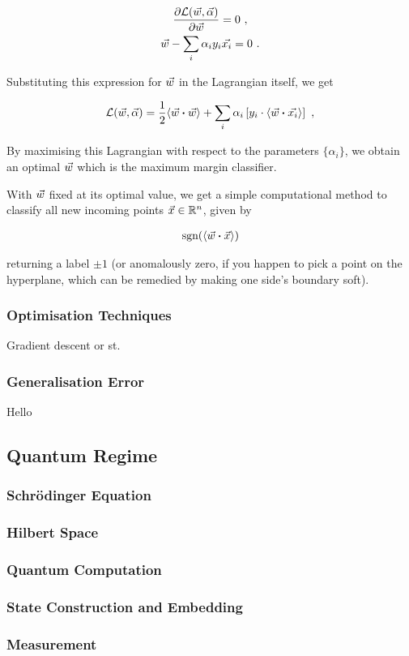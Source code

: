 \begin{gather}
    \frac{\partial \mathcal{L}(\vec{w}, \vec{\alpha})}{\partial \vec{w}} = 0~,\nonumber\\
    \vec{w} - \sum_i \alpha_i y_i \vec{x_i} = 0~.
\end{gather}

Substituting this expression for \(\vec{w}\) in the Lagrangian itself, we get

\begin{gather}
    \mathcal{L}(\vecw, \vec{\alpha}) = \frac{1}{2} \innerprod{\vecw}{\vecw} + \sum_i \alpha_i \left[y_i \cdot \innerprod{\vecw}{\vec{x_i}}\right]~,
\end{gather}

By maximising this Lagrangian with respect to the parameters \(\{\alpha_i\}\),
we obtain an optimal \(\vec{w}\) which is the maximum margin classifier.

With \(\vec{w}\) fixed at its optimal value, we get a simple computational method
to classify all new incoming points \(\vec{x} \in \mathbb{R}^n\), given by

\begin{gather}
    \text{sgn}(\innerprod{\vecw}{\vecx})
\end{gather}

returning a label \(\pm 1\) (or anomalously zero, if you happen to pick a point
on the hyperplane, which can be remedied by making one side's boundary soft).

\subsubsection{Optimisation Techniques}
Gradient descent or st. 

\subsubsection{Generalisation Error}
Hello 

\subsection{Quantum Regime}

\subsubsection{Schr\"odinger Equation}

\subsubsection{Hilbert Space}

\subsubsection{Quantum Computation}

\subsubsection{State Construction and Embedding}

\subsubsection{Measurement}